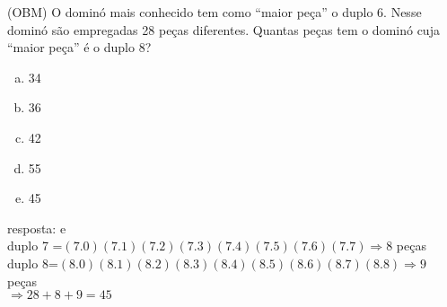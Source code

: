 \begin{ex}
 (OBM) O dominó mais conhecido tem como “maior peça” o duplo 6. Nesse dominó são empregadas 28 peças diferentes. Quantas peças tem o dominó cuja “maior peça” é o duplo 8?
   \begin{enumerate}[(a)]
   \item 34
   \item 36
   \item 42
   \item 55
   \item 45
   \end{enumerate}
     \begin{sol}
      resposta: e \\
      duplo 7 =$ (7.0) (7.1) (7.2) (7.3) (7.4) (7.5) (7.6) (7.7) \Rightarrow 8 $  peças \\
      duplo 8=$ (8.0) (8.1) (8.2) (8.3) (8.4) (8.5) (8.6) (8.7) (8.8) \Rightarrow 9$  peças    \\
      $\Longrightarrow 28+8+9=45$
      \end{sol}
\end{ex}